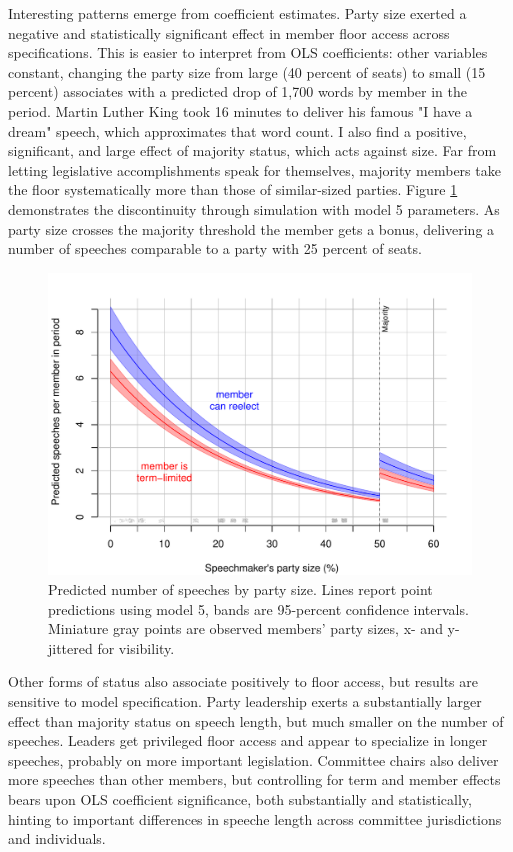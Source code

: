 \documentclass[letter,12pt]{article}
\begin{document}
Interesting patterns emerge from coefficient estimates. Party size exerted a negative and statistically significant effect in member floor access across specifications. This is easier to interpret from OLS coefficients: other variables constant, changing the party size from large (40 percent of seats) to small (15 percent) associates with a predicted drop of 1,700 words by member in the period. Martin Luther King took 16 minutes to deliver his famous "I have a dream" speech, which approximates that word count. I also find a positive, significant, and large effect of majority status, which acts against size. Far from letting legislative accomplishments speak for themselves, majority members take the floor systematically more than those of similar-sized parties. Figure \ref{F:predict} demonstrates the discontinuity through simulation with model 5 parameters. As party size crosses the majority threshold the member gets a bonus, delivering a number of speeches comparable to a party with 25 percent of seats.


\begin{figure}
  \centering
    \includegraphics[width=.67\columnwidth]{../plots/predictedWords.pdf}
    \caption{Predicted number of speeches by party size. Lines report point predictions using model 5, bands are 95-percent confidence intervals. Miniature gray points are observed members' party sizes, x- and y-jittered for visibility.}\label{F:predict}
\end{figure}

Other forms of status also associate positively to floor access, but results are sensitive to model specification. Party leadership exerts a substantially larger effect than majority status on speech length, but much smaller on the number of speeches. Leaders get privileged floor access and appear to specialize in longer speeches, probably on more important legislation. Committee chairs also deliver more speeches than other members, but controlling for term and member effects bears upon OLS coefficient significance, both substantially and statistically, hinting to important differences in speeche length across committee jurisdictions and individuals.
\end{document}
